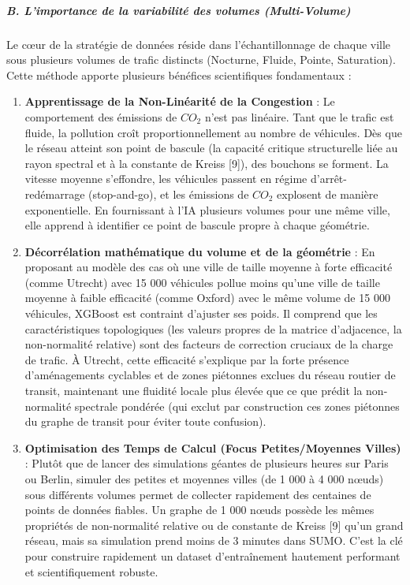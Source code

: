 \documentclass[10pt, a4paper]{article}
\providecommand{\tightlist}{}
\begin{document}
\subparagraph{B. L'importance de la variabilité des volumes
(Multi-Volume)}\label{b.-limportance-de-la-variabilituxe9-des-volumes-multi-volume}

Le cœur de la stratégie de données réside dans l'échantillonnage de
chaque ville sous plusieurs volumes de trafic distincts (Nocturne,
Fluide, Pointe, Saturation). Cette méthode apporte plusieurs bénéfices
scientifiques fondamentaux :

\begin{enumerate}
\def\labelenumi{\arabic{enumi}.}
\tightlist
\item
  \textbf{Apprentissage de la Non-Linéarité de la Congestion} : Le
  comportement des émissions de \(CO_2\) n'est pas linéaire. Tant que le
  trafic est fluide, la pollution croît proportionnellement au nombre de
  véhicules. Dès que le réseau atteint son point de bascule (la capacité
  critique structurelle liée au rayon spectral et à la constante de
  Kreiss {[}9{]}), des bouchons se forment. La vitesse moyenne
  s'effondre, les véhicules passent en régime d'arrêt-redémarrage
  (stop-and-go), et les émissions de \(CO_2\) explosent de manière
  exponentielle. En fournissant à l'IA plusieurs volumes pour une même
  ville, elle apprend à identifier ce point de bascule propre à chaque
  géométrie.
\item
  \textbf{Décorrélation mathématique du volume et de la géométrie} : En
  proposant au modèle des cas où une ville de taille moyenne à forte
  efficacité (comme Utrecht) avec 15 000 véhicules pollue moins qu'une
  ville de taille moyenne à faible efficacité (comme Oxford) avec le
  même volume de 15 000 véhicules, XGBoost est contraint d'ajuster ses
  poids. Il comprend que les caractéristiques topologiques (les valeurs
  propres de la matrice d'adjacence, la non-normalité relative) sont des
  facteurs de correction cruciaux de la charge de trafic. À Utrecht,
  cette efficacité s'explique par la forte présence d'aménagements
  cyclables et de zones piétonnes exclues du réseau routier de transit,
  maintenant une fluidité locale plus élevée que ce que prédit la
  non-normalité spectrale pondérée (qui exclut par construction ces
  zones piétonnes du graphe de transit pour éviter toute confusion).
\item
  \textbf{Optimisation des Temps de Calcul (Focus Petites/Moyennes
  Villes)} : Plutôt que de lancer des simulations géantes de plusieurs
  heures sur Paris ou Berlin, simuler des petites et moyennes villes (de
  1 000 à 4 000 nœuds) sous différents volumes permet de collecter
  rapidement des centaines de points de données fiables. Un graphe de 1
  000 nœuds possède les mêmes propriétés de non-normalité relative ou de
  constante de Kreiss {[}9{]} qu'un grand réseau, mais sa simulation
  prend moins de 3 minutes dans SUMO. C'est la clé pour construire
  rapidement un dataset d'entraînement hautement performant et
  scientifiquement robuste.
\end{enumerate}
\end{document}
